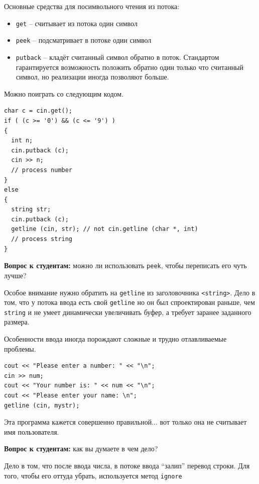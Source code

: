 \documentclass[a4paper,12pt,oneside]{article}
\newif\ifanswers
\begin{document}
Основные средства для посимвольного чтения из потока: 

\begin{itemize}
\item \lstinline!get! -- считывает из потока один символ 
\item \lstinline!peek! -- подсматривает в потоке один символ 
\item \lstinline!putback! -- кладёт считанный символ обратно в поток. Стандартом гарантируется возможность положить обратно один только что считанный символ, но реализации иногда позволяют больше.
\end{itemize}

Можно поиграть со следующим кодом.

\begin{lstlisting}
char c = cin.get();
if ( (c >= '0') && (c <= '9') ) 
{
  int n;
  cin.putback (c);
  cin >> n;
  // process number
} 
else 
{
  string str;
  cin.putback (c);
  getline (cin, str); // not cin.getline (char *, int)
  // process string
}
\end{lstlisting}

\textbf{Вопрос к студентам:} можно ли использовать \lstinline!peek!, чтобы переписать его чуть лучше?

\ifanswers
Правильный ответ:  да, конечно, тогда и \lstinline!putback! можно убрать.
\fi

Особое внимание нужно обратить на \lstinline!getline! из заголовочника \lstinline!<string>!. Дело в том, что у потока ввода есть свой \lstinline!getline! но он был спроектирован раньше, чем \lstinline!string! и не умеет динамически увеличивать буфер, а требует заранее заданного размера.

Особенности ввода иногда порождают сложные и трудно отлавливаемые проблемы.

\begin{lstlisting}
cout << "Please enter a number: " << "\n";
cin >> num;
cout << "Your number is: " << num << "\n";
cout << "Please enter your name: \n";
getline (cin, mystr);
\end{lstlisting}

Эта программа кажется совершенно правильной... вот только она не считывает имя пользователя.

\textbf{Вопрос к студентам:} как вы думаете в чем дело?

\ifanswers
Правильный ответ: см. ниже.
\fi

Дело в том, что после ввода числа, в потоке ввода ``залип'' перевод строки. Для того, чтобы его оттуда убрать, используется метод \lstinline!ignore!
\end{document}
